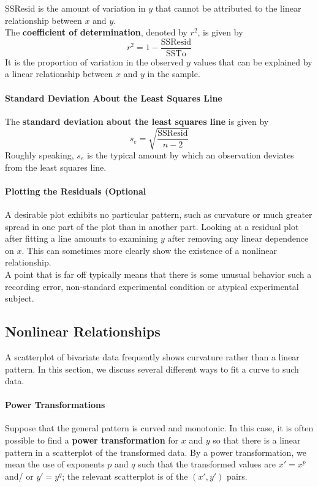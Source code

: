 \documentclass{article}
\newcommand{\p}[1]{\paragraph{#1}} %
\begin{document}
		SSResid is the amount of variation in $y$ that cannot be attributed to the linear 
		relationship between $x$ and $y$. \\
		
		The \textbf{coefficient of determination}, denoted by $r^2$, is given by
		\[ r^2 = 1- \frac{\text{SSResid}}{\text{SSTo}} \]
		It is the proportion of variation in the observed $y$ values that can be explained by a linear 
		relationship between $x$ and $y$ in the sample.
		
	\p{Standard Deviation About the Least Squares Line}
		The \textbf{standard deviation about the least squares line} is given by
		\[ s_e = \sqrt{\frac{\text{SSResid}}{n-2}} \]
		Roughly speaking, $s_e$ is the typical amount by which an observation deviates from the 
		least squares line.
		
	\p{Plotting the Residuals (Optional}
		A desirable plot exhibits no particular pattern, such as curvature or much greater spread in one part of the plot than in another part. Looking at a residual plot after fitting a line 
		amounts to examining $y$ after removing any linear dependence on $x$. This can 
		sometimes more clearly show the existence of a nonlinear relationship. \\
		
		A point that is far off typically means that there is some unusual behavior such a recording 
		error, non-standard experimental condition or atypical experimental subject.	

	\subsection{Nonlinear Relationships} %
	A scatterplot of bivariate data frequently shows curvature rather than a linear pattern. In this 
	section, we discuss several different ways to fit a curve to such data.
	
	\p{Power Transformations}
		Suppose that the general pattern is curved and monotonic. In this case, it is often 
		possible to find a \textbf{power transformation} for $x$ and $y$ so that there is a linear 
		pattern in a scatterplot of the transformed data. By a power transformation, we mean the 
		use of exponents $p$ and $q$ such that the transformed values are $x\prime = x^p$ and/
		or $y\prime = y^q$; the relevant scatterplot is of the $(x\prime ,y\prime)$ pairs. \\
	
\end{document}
